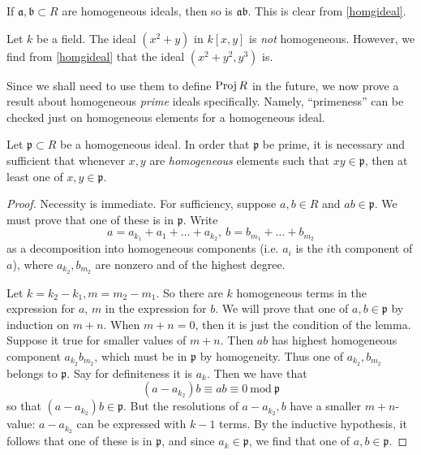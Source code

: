 \begin{example} 
If $\mathfrak{a}, \mathfrak{b} \subset R$ are homogeneous ideals, then so is
$\mathfrak{a}\mathfrak{b}$. This is clear from \cref{homgideal}.
\end{example} 

\begin{example} Let $k$ be a field.
The ideal $(x^2 + y)$ in $k[x,y]$ is \emph{not} homogeneous.
However, we find from \cref{homgideal} that the ideal $(x^2 + y^2, y^3)$ is.
\end{example} 

Since we shall need to use them to define $\operatorname{Proj} R$ in the future, we now
prove a result about homogeneous \emph{prime} ideals specifically. Namely,
``primeness''
can be checked just on homogeneous elements for a homogeneous ideal.
\begin{lemma} \label{homogeneousprimeideal}
Let $\mathfrak{p} \subset R$ be a homogeneous ideal. In order that
$\mathfrak{p}$ be prime, it is
necessary and sufficient that whenever $x,y$ are \emph{homogeneous} elements
such that $xy \in \mathfrak{p}$, then at least one of $x,y \in \mathfrak{p}$.
\end{lemma} 
\begin{proof} 
Necessity is immediate. For sufficiency, suppose $a,b  \in R$ and $ab \in
\mathfrak{p}$. We must prove that one of these is in $\mathfrak{p}$. Write 
\[  a = a_{k_1} + a_1  + \dots + a_{k_2},  \ b = b_{m_1} + \dots + b_{m_2}  \]
as a decomposition into homogeneous components (i.e. $a_i$ is the $i$th
component of $a$),  where $a_{k_2}, b_{m_2}$ are nonzero
and of the highest degree.

Let $k = k_2 - k_1, m = m_2 - m_1$. So there are $k$ homogeneous terms in the
expression for $a$, $m$ in the expression for $b$.
We will prove that one of $a,b \in \mathfrak{p}$ by induction on $m+n$. When
$m+n = 0$, then it is just the condition of the lemma.
Suppose it true for smaller values of $m+n$.
Then $ab$ has highest homogeneous component $a_{k_2} b_{m_2}$, which must be in
$\mathfrak{p}$
by homogeneity.  Thus one of $a_{k_2}, b_{m_2}$ belongs to $\mathfrak{p}$. Say for
definiteness it is $a_k$. Then we have that
\[  (a-a_{k_2})b \equiv ab \equiv 0 \  \mathrm{mod} \  \mathfrak{p}  \]
so that $(a-a_{k_2})b \in \mathfrak{p}$. But the resolutions of $a-a_{k_2}, b$ have a
smaller
$m+n$-value: $a - a_{k_2}$ can be expressed with $k-1$ terms. By the inductive hypothesis, it follows that one of these is in
$\mathfrak{p}$, and since $a_k \in \mathfrak{p}$, we find that one of $a,b \in
\mathfrak{p}$.
\end{proof} 

